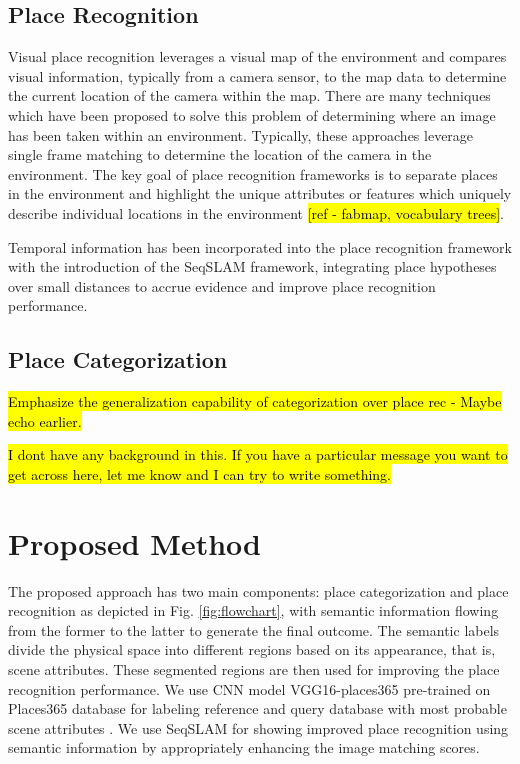 \documentclass[letterpaper, 10 pt, conference]{ieeeconf}  %
\begin{document}
\subsection{Place Recognition}
Visual place recognition leverages a visual map of the environment and compares visual information, typically from a camera sensor, to the map data to determine the current location of the camera within the map. There are many techniques which have been proposed to solve this problem of determining where an image has been taken within an environment. Typically, these approaches leverage single frame matching to determine the location of the camera in the environment. The key goal of place recognition frameworks is to separate places in the environment and highlight the unique attributes or features which uniquely describe individual locations in the environment \hl{[ref - fabmap, vocabulary trees]}. 

Temporal information has been incorporated into the place recognition framework with the introduction of the SeqSLAM framework, integrating place hypotheses over small distances to accrue evidence and improve place recognition performance. 

\subsection{Place Categorization}
\cite{sunderhauf2016place}

\hl{Emphasize the generalization capability of categorization over place rec  - Maybe echo earlier. }

\hl{I dont have any background in this. If you have a particular message you want to get across here, let me know and I can try to write something. }


\section{Proposed Method}
The proposed approach has two main components: place categorization and place recognition as depicted in Fig. \ref{fig:flowchart}, with semantic information flowing from the former to the latter to generate the final outcome. The semantic labels divide the physical space into different regions based on its appearance, that is, scene attributes. These segmented regions are then used for improving the place recognition performance. We use CNN model VGG16-places365 \cite{cnnPlaces365Github} pre-trained on Places365 database \cite{zhou2014learning} for labeling reference and query database with most probable scene attributes \cite{Patterson2012SunAttributes}. We use SeqSLAM \cite{Milford2012} for showing improved place recognition using semantic information by appropriately enhancing the image matching scores.
\end{document}
